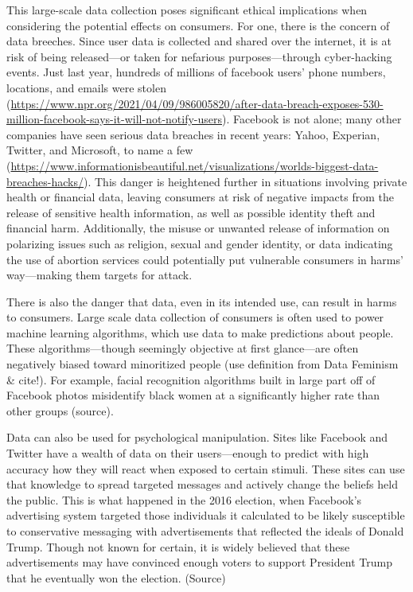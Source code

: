 \documentclass[water,article,submit,moreauthors,pdftex]{mdpi}
\begin{document}
This large-scale data collection poses significant ethical implications
when considering the potential effects on consumers. For one, there is
the concern of data breeches. Since user data is collected and shared
over the internet, it is at risk of being released---or taken for
nefarious purposes---through cyber-hacking events. Just last year,
hundreds of millions of facebook users' phone numbers, locations, and
emails were stolen
(\url{https://www.npr.org/2021/04/09/986005820/after-data-breach-exposes-530-million-facebook-says-it-will-not-notify-users}).
Facebook is not alone; many other companies have seen serious data
breaches in recent years: Yahoo, Experian, Twitter, and Microsoft, to
name a few
(\url{https://www.informationisbeautiful.net/visualizations/worlds-biggest-data-breaches-hacks/}).
This danger is heightened further in situations involving private health
or financial data, leaving consumers at risk of negative impacts from
the release of sensitive health information, as well as possible
identity theft and financial harm. Additionally, the misuse or unwanted
release of information on polarizing issues such as religion, sexual and
gender identity, or data indicating the use of abortion services could
potentially put vulnerable consumers in harms' way---making them targets
for attack.

There is also the danger that data, even in its intended use, can result
in harms to consumers. Large scale data collection of consumers is often
used to power machine learning algorithms, which use data to make
predictions about people. These algorithms---though seemingly objective
at first glance---are often negatively biased toward minoritized people
(use definition from Data Feminism \& cite!). For example, facial
recognition algorithms built in large part off of Facebook photos
misidentify black women at a significantly higher rate than other groups
(source).

Data can also be used for psychological manipulation. Sites like
Facebook and Twitter have a wealth of data on their users---enough to
predict with high accuracy how they will react when exposed to certain
stimuli. These sites can use that knowledge to spread targeted messages
and actively change the beliefs held the public. This is what happened
in the 2016 election, when Facebook's advertising system targeted those
individuals it calculated to be likely susceptible to conservative
messaging with advertisements that reflected the ideals of Donald Trump.
Though not known for certain, it is widely believed that these
advertisements may have convinced enough voters to support President
Trump that he eventually won the election. (Source)
\end{document}
